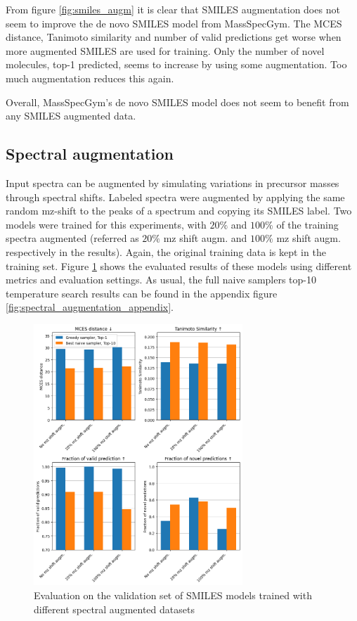 From figure \ref{fig:smiles_augm} it is clear that SMILES augmentation does not seem to improve the de novo SMILES model from MassSpecGym.
The MCES distance, Tanimoto similarity and number of valid predictions get worse when more augmented SMILES are used for training.
Only the number of novel molecules, top-1 predicted, seems to increase by using some augmentation.
Too much augmentation reduces this again.

Overall, MassSpecGym's de novo SMILES model does not seem to benefit from any SMILES augmented data.

\subsection{Spectral augmentation}

Input spectra can be augmented by simulating variations in precursor masses through spectral shifts.
Labeled spectra were augmented by applying the same random mz-shift to the peaks of a spectrum and copying its SMILES label.
Two models were trained for this experiments, with $20\%$ and $100\%$ of the training spectra augmented (referred as $20\%$ mz shift augm. and $100\%$ mz shift augm. respectively in the results).
Again, the original training data is kept in the training set.
Figure \ref{fig:spectral_augm} shows the evaluated results of these models using different metrics and evaluation settings.
As usual, the full naive samplers top-10 temperature search results can be found in the appendix figure \ref{fig:spectral_augmentation_appendix}.

\begin{figure}[h]
    \centering
    \includegraphics[width=0.7\textwidth]{figures/results/spectrum_augmentation_with_tanimoto.png}
    \caption{Evaluation on the validation set of SMILES models trained with different spectral augmented datasets}
    \label{fig:spectral_augm}
\end{figure}


